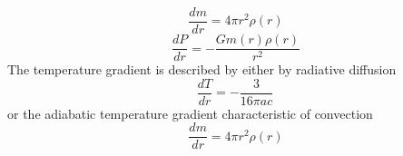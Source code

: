 \begin{equation}
    \frac{dm}{dr} = 4\pi r^2 \rho(r)
\end{equation}
\begin{equation}
    \frac{dP}{dr} = -\frac{G m(r)\rho(r)}{r^2}
\end{equation}
The temperature gradient is described by either by radiative diffusion
\begin{equation}
    \frac{dT}{dr} = -\frac{3}{16\pi ac}\frac{}{}
\end{equation}
or the adiabatic temperature gradient characteristic of convection
\begin{equation}
    \frac{dm}{dr} = 4\pi r^2 \rho(r)
\end{equation}